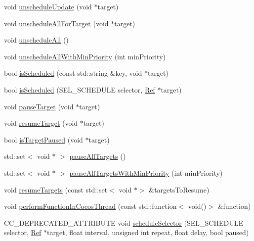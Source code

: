 \begin{DoxyCompactItemize}
\item 
void \hyperlink{classScheduler_acc7bc87cc441a0f826c2a6758a9adcad}{unschedule\+Update} (void $\ast$target)
\item 
void \hyperlink{classScheduler_a39199385fc1ab4f74c5665beaa2738b6}{unschedule\+All\+For\+Target} (void $\ast$target)
\item 
void \hyperlink{classScheduler_a0746c417a3cf7c794d1ee32969994e6a}{unschedule\+All} ()
\item 
void \hyperlink{classScheduler_aa846e95ed320bdac9ca2c91a0d7e79db}{unschedule\+All\+With\+Min\+Priority} (int min\+Priority)
\item 
bool \hyperlink{classScheduler_a5b534eae62394806603e522ab4191d3b}{is\+Scheduled} (const std\+::string \&key, void $\ast$target)
\item 
bool \hyperlink{classScheduler_a95ed753a2875e2635b5120cee5c3e432}{is\+Scheduled} (S\+E\+L\+\_\+\+S\+C\+H\+E\+D\+U\+LE selector, \hyperlink{classRef}{Ref} $\ast$target)
\item 
void \hyperlink{classScheduler_a409cb6f82cffd7d779154d9d813664af}{pause\+Target} (void $\ast$target)
\item 
void \hyperlink{classScheduler_aebdab814dbc692356f813d335c3b92af}{resume\+Target} (void $\ast$target)
\item 
bool \hyperlink{classScheduler_aef17d4d358516d712c32ac421202198c}{is\+Target\+Paused} (void $\ast$target)
\item 
std\+::set$<$ void $\ast$ $>$ \hyperlink{classScheduler_a5a624f0bf247439e11f45388dce5d465}{pause\+All\+Targets} ()
\item 
std\+::set$<$ void $\ast$ $>$ \hyperlink{classScheduler_ac981921d200acdeedffa17c5e0c06f77}{pause\+All\+Targets\+With\+Min\+Priority} (int min\+Priority)
\item 
void \hyperlink{classScheduler_a5b568bffe196f3a5cefe0739354dc900}{resume\+Targets} (const std\+::set$<$ void $\ast$$>$ \&targets\+To\+Resume)
\item 
void \hyperlink{classScheduler_acd6da28a03a7f8b9df377f1e05e7883f}{perform\+Function\+In\+Cocos\+Thread} (const std\+::function$<$ void()$>$ \&function)
\item 
C\+C\+\_\+\+D\+E\+P\+R\+E\+C\+A\+T\+E\+D\+\_\+\+A\+T\+T\+R\+I\+B\+U\+TE void \hyperlink{classScheduler_ae8df7fdf2f74a90cdb37bc334a550360}{schedule\+Selector} (S\+E\+L\+\_\+\+S\+C\+H\+E\+D\+U\+LE selector, \hyperlink{classRef}{Ref} $\ast$target, float interval, unsigned int repeat, float delay, bool paused)
\item 
$$
\end{DoxyCompactItemize}
